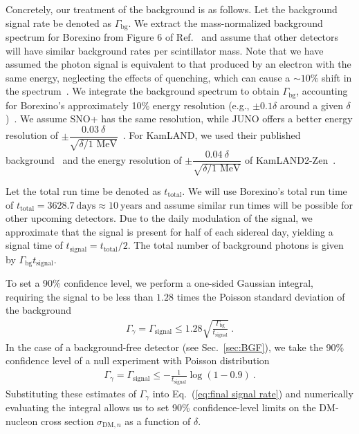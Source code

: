 \documentclass[aps,prd,amsmath,amssymb,10pt,letterpaper,balancelastpage,showpacs,superscriptaddress,nofootinbib,floatfix,notitlepage,longbibliography,twocolumn
]{revtex4-2}
\newcommand{\Eq}[1]{Eq.~(#1)}
\newcommand{\Gg}{\Gamma_{\gamma}}
\newcommand{\Gammasignal}{\Gamma_{\text{signal}}}
\newcommand{\ttotal}{t_{\text{total}}}
\newcommand{\tsignal}{t_{\text{signal}}}
\newcommand{\Gammabackground}{\Gamma_{\text{bg}}}
\begin{document}
Concretely, our treatment of the background is as follows. Let the background signal rate be denoted as $\Gammabackground$. We extract the mass-normalized background spectrum for Borexino from Figure 6 of Ref.~\cite{Luminous} and assume that other detectors will have similar background rates per scintillator mass. Note that we have assumed the photon signal is equivalent to that produced by an electron with the same energy, neglecting the effects of quenching, which can cause a $\sim 10\%$ shift in the spectrum~\cite{Borexino_Electron_Decay}. We integrate the background spectrum to obtain $\Gammabackground$, accounting for Borexino’s approximately 10\% energy resolution (e.g., $\pm 0.1 \delta$ around a given $\delta$)~\cite{Borexino_Electron_Decay}. We assume SNO+ has the same resolution, while JUNO offers a better energy resolution of $\pm \dfrac{0.03~\delta}{\sqrt{\delta/\text{1 MeV}}} $~\cite{JUNO_Conceptual}. For KamLAND, we used their published background~\cite{Kamland} and the energy resolution of $\pm \dfrac{0.04~\delta}{\sqrt{\delta/\text{1 MeV}}} $ of KamLAND2-Zen~\cite{ChristGrant}.

Let the total run time be denoted as $\ttotal$. We will use Borexino's total run time of $\ttotal=3628.7~\text{days}\approx 10~\text{years}$ and assume similar run times will be possible for other upcoming detectors. Due to the daily modulation of the signal, we approximate that the signal is present for half of each sidereal day, yielding a signal time of $\tsignal = \ttotal/2$. The total number of background photons is given by $\Gammabackground \tsignal$.

To set a 90\% confidence level, we perform a one-sided Gaussian integral, requiring the signal to be less than $1.28$ times the Poisson standard deviation of the background
\begin{align}
    \Gg = \Gammasignal \leq 1.28 \sqrt{\frac{\Gammabackground}{\tsignal}} ~.
\end{align}
In the case of a background-free detector (see Sec.~\ref{sec:BGF}), we take the 90\% confidence level of a null experiment with Poisson distribution~\cite{StatsBook}
\begin{align}
    \Gg = \Gammasignal \leq -\frac{1}{\tsignal} \log(1-0.9) ~.
\end{align}
Substituting these estimates of $\Gg$ into \Eq{\ref{eq:final signal rate}} and numerically evaluating the integral allows us to set 90\% confidence-level limits on the DM-nucleon cross section $\sigma_{\text{DM},n}$ as a function of $\delta$.
\end{document}
